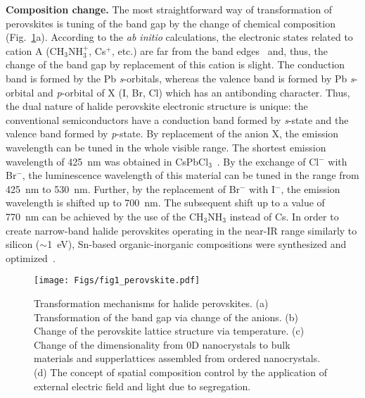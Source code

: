 \documentclass[journal=chreay,manuscript=review]{achemso}
\begin{document}
\textbf{Composition change.}
The most straightforward way of transformation of perovskites is tuning of the band gap by the change of chemical composition (Fig.~\ref{fig:pero1}a). According to the \textit{ab initio} calculations, the electronic states related to cation A (CH$_3$NH$_3^+$, Cs$^+$, etc.) are far from the band edges~\cite{yin2015halide} and, thus, the change of the band gap by replacement of this cation is slight. The conduction band is formed by the Pb \textit{s}-orbitals, whereas the valence band is formed by Pb \textit{s}-orbital and \textit{p}-orbital of X (I, Br, Cl) which has an antibonding character. Thus, the dual nature of halide perovskite electronic structure is unique: the conventional semiconductors have a conduction band formed by \textit{s}-state and the valence band formed by \textit{p}-state. By replacement of the anion X, the emission wavelength can be tuned in the whole visible range\cite{sutherland2016perovskite}. The shortest emission wavelength of 425~nm was obtained in CsPbCl$_3$~\cite{protesescu2015nanocrystals}. By the exchange of Cl$^-$ with Br$^-$, the luminescence wavelength of this material can be tuned in the range from 425~nm to 530~nm. Further, by the replacement of Br$^-$ with I$^-$, the emission wavelength is shifted up to 700~nm. The subsequent shift up to a value of 770~nm can be achieved by the use of the CH$_3$NH$_3$ instead of Cs\cite{zhao2017high}. In order to create narrow-band halide perovskites operating in the near-IR range similarly to silicon ($\sim$1~eV), Sn-based organic-inorganic compositions were synthesized and optimized~\cite{chang2020tunable}.


\begin{figure}[h!]
    \centering
    \texttt{[image: Figs/fig1\_perovskite.pdf]}
    \caption{
    Transformation mechanisms for halide perovskites. (a) Transformation of the band gap via change of the anions. (b) Change of the perovskite lattice structure via temperature. (c) Change of the dimensionality from 0D nanocrystals to bulk materials and supperlattices assembled from ordered nanocrystals. (d) The concept of spatial composition control by the application of external electric field and light due to segregation. %
    }
    \label{fig:pero1}
\end{figure}
\end{document}
